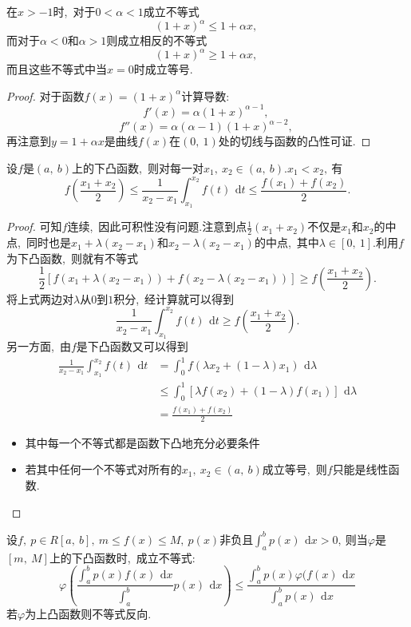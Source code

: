 \begin{proposition}[Bernoulli不等式]
	在$x>-1$时,\ 对于$0<\alpha<1$成立不等式
	$$(1+x)^\alpha\leqslant 1 +\alpha x,\ $$
	而对于$\alpha<0$和$\alpha>1$则成立相反的不等式
	$$(1+x)^\alpha\geqslant 1+\alpha x,\ $$
	而且这些不等式中当$x=0$时成立等号.
\end{proposition}
\begin{proof}
	对于函数$f(x)=(1+x)^\alpha$计算导数:
	$$f'(x)=\alpha(1+x)^{\alpha-1},\ $$
	$$f''(x)=\alpha(\alpha-1)(1+x)^{\alpha-2},\ $$
	再注意到$y=1+\alpha x$是曲线$f(x)$在$(0,\ 1)$处的切线与函数的凸性可证.
\end{proof}
\begin{proposition}[Hadamard不等式]
	设$f$是$(a,\ b)$上的下凸函数,\ 则对每一对$x_1,\ x_2\in(a,\ b).x_1<x_2,\ $有
	$$f\left(\frac{x_1+x_2}{2}\right)\leqslant\frac{1}{x_2-x_1}\int_{x_1}^{x_2}f(t)\,\ \text{d}t\leqslant\frac{f(x_1)+f(x_2)}{2}.$$
\end{proposition}
\begin{proof}
	可知$f$连续,\ 因此可积性没有问题.注意到点$\frac{1}{2}(x_1+x_2)$不仅是$x_1$和$x_2$的中点,\ 同时也是$x_1+\lambda(x_2-x_1)$和$x_2-\lambda(x_2-x_1)$的中点,\ 其中$\lambda\in\left[0,\ 1\right].$利用$f$为下凸函数,\ 则就有不等式
	$$\frac{1}{2}[f(x_1+\lambda(x_2-x_1))+f(x_2-\lambda(x_2-x_1))]\geqslant f\left(\frac{x_1+x_2}{2}\right).$$
	将上式两边对$\lambda$从$0$到$1$积分,\ 经计算就可以得到
	$$\frac{1}{x_2-x_1}\int_{x_1}^{x_2}f(t)\,\ \text{d}t\geqslant f\left(\frac{x_1+x_2}{2}\right).$$
	另一方面,\ 由$f$是下凸函数又可以得到
	\begin{align*}
		\frac{1}{x_2-x_1}\int_{x_1}^{x_2}f(t)\,\ \text{d}t&=\int_{0}^{1}f(\lambda x_2+(1-\lambda)x_1)\,\ \text{d}\lambda\\
		&\leqslant\int_{0}^{1}[\lambda f(x_2)+(1-\lambda)f(x_1)]\,\ \text{d}\lambda\\
		&=\frac{f(x_1)+f(x_2)}{2}
	\end{align*}
	\begin{note}
		\begin{itemize}
			\item 其中每一个不等式都是函数下凸地充分必要条件\\
			\item 若其中任何一个不等式对所有的$x_1,\ x_2\in(a,\ b)$成立等号,\ 则$f$只能是线性函数.	
		\end{itemize}
	\end{note}
\end{proof}
\begin{proposition}[Jesen不等式]
	设$f,\ p\in R[a,\ b],\ m\leqslant f(x)\leqslant M,\ p(x)$非负且$\int_{a}^{b}p(x)\,\ \text{d}x>0,\ $则当$\varphi$是$[m,\ M]$上的下凸函数时,\ 成立不等式:
	$$\varphi\left(\frac{\int_{a}^{b}p(x)f(x)\,\ \text{d}x}{\int_{a}^{b}}p(x)\,\ \text{d}x\right)\leqslant\frac{\int_{a}^{b}p(x)\varphi(f(x)\,\ \text{d}x}{\int_{a}^{b}p(x)\,\ \text{d}x}$$
	若$\varphi$为上凸函数则不等式反向.
\end{proposition}
